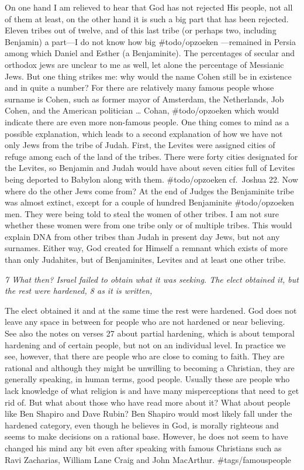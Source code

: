 On one hand I am relieved to hear that God has not rejected His people,
not all of them at least, on the other hand it is such a big part that
has been rejected. Eleven tribes out of twelve, and of this last tribe
(or perhaps two, including Benjamin) a part---I do not know how big
\#todo/opzoeken ---remained in Persia among which Daniel and Esther (a
Benjaminite). The percentages of secular and orthodox jews are unclear
to me as well, let alone the percentage of Messianic Jews. But one thing
strikes me: why would the name Cohen still be in existence and in quite
a number? For there are relatively many famous people whose surname is
Cohen, such as former mayor of Amsterdam, the Netherlands, Job Cohen,
and the American politician \ldots{} Cohan, \#todo/opzoeken which would
indicate there are even more non-famous people. One thing comes to mind
as a possible explanation, which leads to a second explanation of how we
have not only Jews from the tribe of Judah. First, the Levites were
assigned cities of refuge among each of the land of the tribes. There
were forty cities designated for the Levites, so Benjamin and Judah
would have about seven cities full of Levites being deported to Babylon
along with them. \#todo/opzoeken cf.~Joshua 22. Now where do the other
Jews come from? At the end of Judges the Benjaminite tribe was almost
extinct, except for a couple of hundred Benjaminite \#todo/opzoeken men.
They were being told to steal the women of other tribes. I am not sure
whether these women were from one tribe only or of multiple tribes. This
would explain DNA from other tribes than Judah in present day Jews, but
not any surnames. Either way, God created for Himself a remnant which
exists of more than only Judahites, but of Benjaminites, Levites and at
least one other tribe.

\emph{7 What then? Israel failed to obtain what it was seeking. The
elect obtained it, but the rest were hardened, 8 as it is written,}

The elect obtained it and at the same time the rest were hardened. God
does not leave any space in between for people who are not hardened or
near believing. See also the notes on verses 27 about partial hardening,
which is about temporal hardening and of certain people, but not on an
individual level. In practice we see, however, that there are people who
are close to coming to faith. They are rational and although they might
be unwilling to becoming a Christian, they are generally speaking, in
human terms, good people. Usually these are people who lack knowledge of
what religion is and have many misperceptions that need to get rid of.
But what about those who have read more about it? What about people like
Ben Shapiro and Dave Rubin? Ben Shapiro would most likely fall under the
hardened category, even though he believes in God, is morally righteous
and seems to make decisions on a rational base. However, he does not
seem to have changed his mind any bit even after speaking with famous
Christians such as Ravi Zacharias, William Lane Craig and John
MacArthur. \#tags/famouspeople

